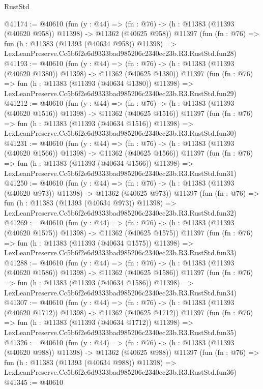 \begin{lexlean}{RustStd}
\begin{coremodule}
@41174 := @40610
    (fun (y : @44) =>
    (fn : @76) -> (h : @11383 (@11393 (@40620 @958)) @11398) -> @11362 (@40625 @958))
    @11397
    (fun (fn : @76) =>
    fun (h : @11383 (@11393 (@40634 @958)) @11398) =>
    LexLeanPreserve.Cc5b6f2e6d9333bad985206c2340ec23b.R3.RustStd.fun28)
@41193 := @40610
    (fun (y : @44) =>
    (fn : @76) -> (h : @11383 (@11393 (@40620 @1380)) @11398) -> @11362 (@40625 @1380))
    @11397
    (fun (fn : @76) =>
    fun (h : @11383 (@11393 (@40634 @1380)) @11398) =>
    LexLeanPreserve.Cc5b6f2e6d9333bad985206c2340ec23b.R3.RustStd.fun29)
@41212 := @40610
    (fun (y : @44) =>
    (fn : @76) -> (h : @11383 (@11393 (@40620 @1516)) @11398) -> @11362 (@40625 @1516))
    @11397
    (fun (fn : @76) =>
    fun (h : @11383 (@11393 (@40634 @1516)) @11398) =>
    LexLeanPreserve.Cc5b6f2e6d9333bad985206c2340ec23b.R3.RustStd.fun30)
@41231 := @40610
    (fun (y : @44) =>
    (fn : @76) -> (h : @11383 (@11393 (@40620 @1566)) @11398) -> @11362 (@40625 @1566))
    @11397
    (fun (fn : @76) =>
    fun (h : @11383 (@11393 (@40634 @1566)) @11398) =>
    LexLeanPreserve.Cc5b6f2e6d9333bad985206c2340ec23b.R3.RustStd.fun31)
@41250 := @40610
    (fun (y : @44) =>
    (fn : @76) -> (h : @11383 (@11393 (@40620 @973)) @11398) -> @11362 (@40625 @973))
    @11397
    (fun (fn : @76) =>
    fun (h : @11383 (@11393 (@40634 @973)) @11398) =>
    LexLeanPreserve.Cc5b6f2e6d9333bad985206c2340ec23b.R3.RustStd.fun32)
@41269 := @40610
    (fun (y : @44) =>
    (fn : @76) -> (h : @11383 (@11393 (@40620 @1575)) @11398) -> @11362 (@40625 @1575))
    @11397
    (fun (fn : @76) =>
    fun (h : @11383 (@11393 (@40634 @1575)) @11398) =>
    LexLeanPreserve.Cc5b6f2e6d9333bad985206c2340ec23b.R3.RustStd.fun33)
@41288 := @40610
    (fun (y : @44) =>
    (fn : @76) -> (h : @11383 (@11393 (@40620 @1586)) @11398) -> @11362 (@40625 @1586))
    @11397
    (fun (fn : @76) =>
    fun (h : @11383 (@11393 (@40634 @1586)) @11398) =>
    LexLeanPreserve.Cc5b6f2e6d9333bad985206c2340ec23b.R3.RustStd.fun34)
@41307 := @40610
    (fun (y : @44) =>
    (fn : @76) -> (h : @11383 (@11393 (@40620 @1712)) @11398) -> @11362 (@40625 @1712))
    @11397
    (fun (fn : @76) =>
    fun (h : @11383 (@11393 (@40634 @1712)) @11398) =>
    LexLeanPreserve.Cc5b6f2e6d9333bad985206c2340ec23b.R3.RustStd.fun35)
@41326 := @40610
    (fun (y : @44) =>
    (fn : @76) -> (h : @11383 (@11393 (@40620 @988)) @11398) -> @11362 (@40625 @988))
    @11397
    (fun (fn : @76) =>
    fun (h : @11383 (@11393 (@40634 @988)) @11398) =>
    LexLeanPreserve.Cc5b6f2e6d9333bad985206c2340ec23b.R3.RustStd.fun36)
@41345 := @40610

\end{coremodule}
\end{lexlean}
